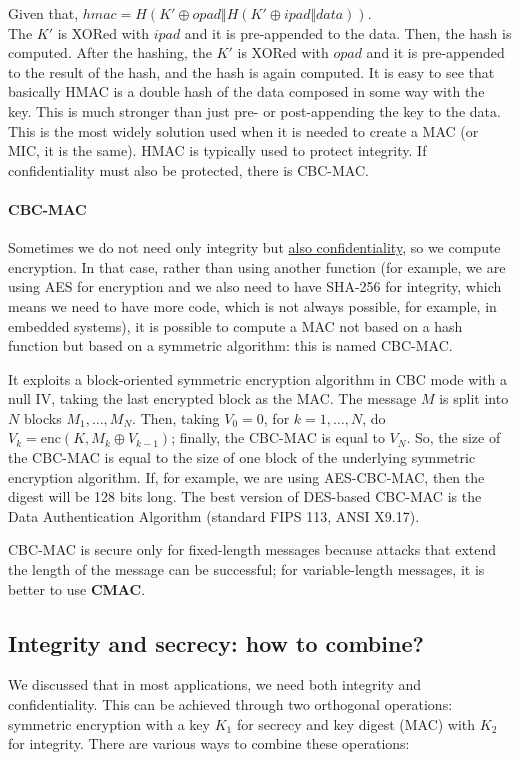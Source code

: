Given that, \(hmac = H(K' \oplus opad \Vert H(K' \oplus ipad \Vert data))\).\\
The \(K'\) is XORed with \(ipad\) and it is pre-appended to the data. Then, the hash is computed. After the hashing, the \(K'\) is XORed with \(opad\) and it is pre-appended to the result of the hash, and the hash is again computed. It is easy to see that basically HMAC is a double hash of the data composed in some way with the key. This is much stronger than just pre- or post-appending the key to the data. This is the most widely solution used when it is needed to create a MAC (or MIC, it is the same). HMAC is typically used to protect integrity. If confidentiality must also be protected, there is CBC-MAC.


\paragraph{CBC-MAC}
Sometimes we do not need only integrity but \underline{also confidentiality}, so we compute encryption. In that case, rather than using another function (for example, we are using AES for encryption and we also need to have SHA-256 for integrity, which means we need to have more code, which is not always possible, for example, in embedded systems), it is possible to compute a MAC not based on a hash function but based on a symmetric algorithm: this is named CBC-MAC.

It exploits a block-oriented symmetric encryption algorithm in CBC mode with a null IV, taking the last encrypted block as the MAC. The message \(M\) is split into \(N\) blocks \(M_1, \ldots, M_N\). Then, taking \(V_0 = 0\), for \(k = 1, \ldots, N\), do \(V_k = \text{enc}(K, M_k \oplus V_{k-1})\); finally, the CBC-MAC is equal to \(V_N\). So, the size of the CBC-MAC is equal to the size of one block of the underlying symmetric encryption algorithm. If, for example, we are using AES-CBC-MAC, then the digest will be 128 bits long. The best version of DES-based CBC-MAC is the Data Authentication Algorithm (standard FIPS 113, ANSI X9.17).

CBC-MAC is secure only for fixed-length messages because attacks that extend the length of the message can be successful; for variable-length messages, it is better to use \textbf{CMAC}.


\subsection{Integrity and secrecy: how to combine?}
We discussed that in most applications, we need both integrity and confidentiality. This can be achieved through two orthogonal operations: symmetric encryption with a key \(K_1\) for secrecy and key digest (MAC) with \(K_2\) for integrity. There are various ways to combine these operations:

